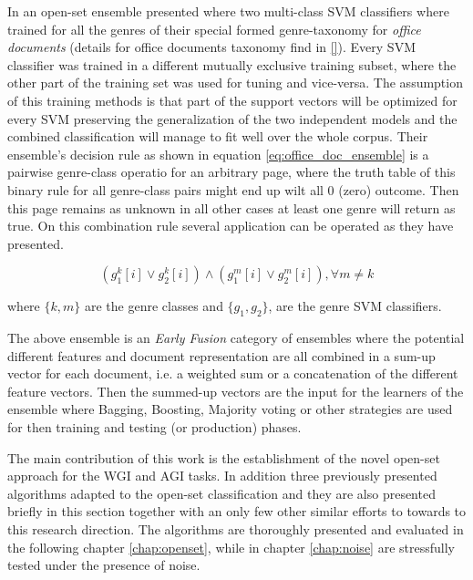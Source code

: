 In \parencite{chen2012genre} an open-set ensemble presented where two multi-class SVM classifiers where trained for all the genres of their special formed genre-taxonomy for \textit{office documents} (details for office documents taxonomy find in \ref{}). Every SVM classifier was trained in a different mutually exclusive training subset, where the other part of the training set was used for tuning and vice-versa. The assumption of this training methods is that part of the support vectors  will be optimized for every SVM preserving the generalization of the two independent models and the combined classification will manage to fit well over the whole corpus. Their ensemble's decision rule as shown in equation \ref{eq:office_doc_ensemble} is a pairwise genre-class operatio for an arbitrary page, where the truth table of this binary rule for all genre-class pairs might end up wilt all $0$ (zero) outcome. Then this page remains as unknown in all other cases at least one genre will return as true. On this combination rule several application can be operated as they have presented.

\begin{equation}\label{eq:office_doc_ensemble}
	(g^{k}_{1}[i] \vee g^{k}_{2}[i])  \wedge  (g^{m}_{1}[i] \vee g^{m}_{2}[i]) ,   \forall m \neq k
\end{equation}

where $\{k, m\}$ are the genre classes and $\{g_{1}, g_{2}\}$, are the genre SVM classifiers.
		
The above ensemble is an \textit{Early Fusion} category of ensembles where the potential different features and document representation are all combined in a sum-up vector for each document, i.e. a weighted sum or a concatenation of the different feature vectors. Then the summed-up vectors are the input for the learners of the ensemble where Bagging, Boosting, Majority voting or other strategies are used for then training and testing (or production) phases.

The main contribution of this work is the establishment of the novel open-set approach for the WGI and AGI tasks. In addition three previously presented algorithms adapted to the open-set classification and they are also presented briefly in this section together with an only few other similar efforts to towards to this research direction. The algorithms are thoroughly presented and evaluated in the following chapter \ref{chap:openset}, while in chapter \ref{chap:noise} are stressfully tested under the presence of noise.

